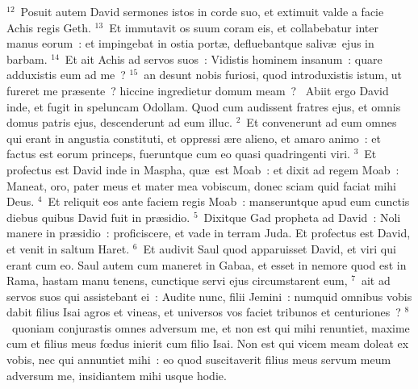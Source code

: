 ${}^{12}$~Posuit autem David sermones istos in corde suo, et extimuit valde a facie Achis regis Geth.
${}^{13}$~Et immutavit os suum coram eis, et collabebatur inter manus eorum~: et impingebat in ostia port\ae , defluebantque saliv\ae\ ejus in barbam.
${}^{14}$~Et ait Achis ad servos suos~: Vidistis hominem insanum~: quare adduxistis eum ad me~?
${}^{15}$~an desunt nobis furiosi, quod introduxistis istum, ut fureret me pr\ae sente~? hiccine ingredietur domum meam~?
~Abiit ergo David inde, et fugit in speluncam Odollam. Quod cum audissent fratres ejus, et omnis domus patris ejus, descenderunt ad eum illuc.
${}^{2}$~Et convenerunt ad eum omnes qui erant in angustia constituti, et oppressi \ae re alieno, et amaro animo~: et factus est eorum princeps, fueruntque cum eo quasi quadringenti viri.
${}^{3}$~Et profectus est David inde in Maspha, qu\ae\ est Moab~: et dixit ad regem Moab~: Maneat, oro, pater meus et mater mea vobiscum, donec sciam quid faciat mihi Deus.
${}^{4}$~Et reliquit eos ante faciem regis Moab~: manseruntque apud eum cunctis diebus quibus David fuit in pr\ae sidio.
${}^{5}$~Dixitque Gad propheta ad David~: Noli manere in pr\ae sidio~: proficiscere, et vade in terram Juda. Et profectus est David, et venit in saltum Haret.
${}^{6}$~Et audivit Saul quod apparuisset David, et viri qui erant cum eo. Saul autem cum maneret in Gabaa, et esset in nemore quod est in Rama, hastam manu tenens, cunctique servi ejus circumstarent eum,
${}^{7}$~ait ad servos suos qui assistebant ei~: Audite nunc, filii Jemini~: numquid omnibus vobis dabit filius Isai agros et vineas, et universos vos faciet tribunos et centuriones~?
${}^{8}$~quoniam conjurastis omnes adversum me, et non est qui mihi renuntiet, maxime cum et filius meus fœdus inierit cum filio Isai. Non est qui vicem meam doleat ex vobis, nec qui annuntiet mihi~: eo quod suscitaverit filius meus servum meum adversum me, insidiantem mihi usque hodie.


